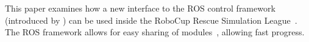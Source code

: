 \begin{comment}
One reason for the simulation environment's popularity is that it enables researchers to focus on algorithm development without having to worry about the hardware aspects of the robots. Simulation can be an effective first step in the development and deployment of new algorithms and provides extensive testing opportunities without the risk of harming personnel or equipment. Major components of the robotic architecture (for example, advanced sensors) can be simulated and enable the developers to focus on the algorithms or components in which they are interested without the need to purchase expensive hardware. This can be useful when development teams are working in parallel or when experimenting with novel technological components that may not be fully implemented or available.

Simulation can also be used to provide access to environments that would normally not be available to the development team. Particular test scenarios can be run repeatedly, with the assurance that conditions are identical for each run. The environmental conditions, such as time of day, lighting, or weather, as well as the position and behavior of other entities in the world can be fully controlled. In terms of performance evaluation, it can truly provide an ``apples-to-apples" comparison of different software running on identical hardware platforms in identical environments. Another important feature of a robotic simulator is easy integration of different robotic platforms, different scenarios, different objects in the scene, as well
as support for multi-robot applications.
\end{comment}

This paper examines how a new interface to  the ROS control framework (introduced by \cite{Balakirsky2012}) can be used inside the RoboCup Rescue Simulation League~\cite{Akin2013}.
The ROS framework allows for easy sharing of modules~\cite{SharingSoftware}, allowing fast progress. 

